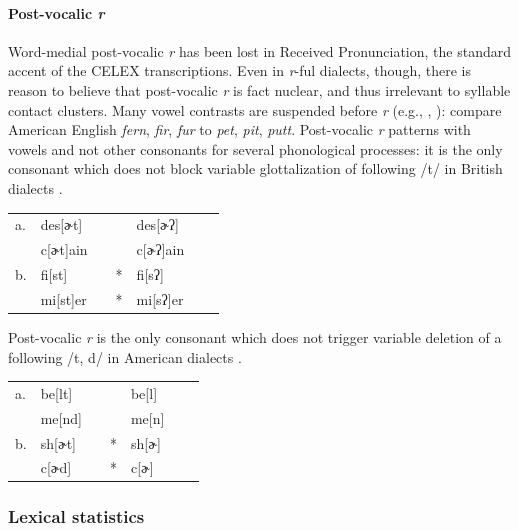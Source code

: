 \paragraph{Post-vocalic \emph{r}} Word-medial post-vocalic \emph{r} has been lost in Received Pronunciation, the standard accent of the CELEX transcriptions. Even in \emph{r}-ful dialects, though, there is reason to believe that post-vocalic \emph{r} is fact nuclear, and thus irrelevant to syllable contact clusters. Many vowel contrasts are suspended before \emph{r} (e.g., \citealt[269f.]{Fudge1969}, \citealt[][255]{Harris1994}): compare American English \emph{fern}, \emph{fir}, \emph{fur} to \emph{pet}, \emph{pit}, \emph{putt}. Post-vocalic \emph{r} patterns with vowels and not other consonants for several phonological processes: it is the only consonant which does not block variable glottalization of following /t/ in British dialects \citep[258]{Harris1994}. 

\begin{example}
\begin{tabular}{l l l l@{} l l l}
a. & {des}[ɚt]    & \alt{} &   & {des}[ɚʔ]    \\
   & {c}[ɚt]{ain} & \alt{} &   & {c}[ɚʔ]{ain} \\
b. & {fi}[st]     & \alt{} & * & {fi}[sʔ]     \\
   & {mi}[st]{er} & \alt{} & * & {mi}[sʔ]{er} \\
\end{tabular}
\end{example}

\noindent Post-vocalic \emph{r} is the only consonant which does not trigger variable deletion of a following /t, d/ in American dialects \citep[8]{Guy1980}.

\begin{example}
\begin{tabular}{l l l l@{} l l l}
a. & {be}[lt] & \alt{} &   & {be}[l] \\
   & {me}[nd] & \alt{} &   & {me}[n] \\
b. & {sh}[ɚt] & \alt{} & * & {sh}[ɚ] \\
   & {c}[ɚd]  & \alt{} & * & {c}[ɚ]  \\
\end{tabular}
\end{example}

\subsubsection{Lexical statistics}

